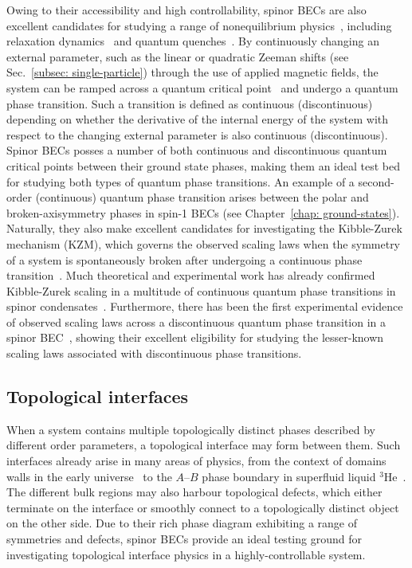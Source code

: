 Owing to their accessibility and high controllability, spinor BECs are also
excellent candidates for studying a range of nonequilibrium
physics~\cite{Schmaljohann2004}, including
relaxation dynamics~\cite{Gring2012, Reeves2022} and quantum
quenches~\cite{Sadler2006,Barnett2011,Navon2015,Symes2017,Kang2017,Prufer2018,
Schmied2019,Liu2020}.
By continuously changing an external parameter, such as the linear or quadratic
Zeeman shifts (see Sec.~\ref{subsec: single-particle}) through the use of
applied magnetic fields, the system can be ramped across a
quantum critical point~\cite{Sachdev2011} and undergo a quantum phase
transition.
Such a transition is defined as continuous (discontinuous) depending on whether
the derivative of the internal energy of the system with respect to the changing
external parameter is also continuous (discontinuous).
Spinor BECs posses a number of both continuous and discontinuous quantum
critical points between their ground state phases, making them an ideal test bed
for studying both types of quantum phase transitions.
An example of a second-order (continuous) quantum phase transition arises
between the polar and broken-axisymmetry phases in spin-1 BECs (see
Chapter~\ref{chap: ground-states}).
Naturally, they also make excellent candidates for investigating the
Kibble-Zurek mechanism (KZM), which governs the observed scaling laws when the
symmetry of a system is spontaneously broken after undergoing a continuous phase
transition~\cite{DelCampo2014}.
Much theoretical and experimental work has already confirmed Kibble-Zurek
scaling in a multitude of continuous quantum phase transitions in spinor
condensates~\cite{Sadler2006, Damski2006,Damski2007, Lamacraft2007,Saito2007,
Saito2007a,Vengalattore2008, Swislocki2013, Witkowska2013, Anquez2016,
Williamson2016,Kang2017}.
Furthermore, there has been the first experimental evidence of observed scaling
laws across a discontinuous quantum phase transition in a spinor
BEC~\cite{Qiu2020}, showing their excellent eligibility for studying the
lesser-known scaling laws associated with discontinuous phase transitions.

\subsection{Topological interfaces}
When a system contains multiple topologically distinct phases described by
different order parameters, a topological interface may form between them.
Such interfaces already arise in many areas of physics, from the context of
domains walls in the early universe~\cite{Zeldovich1975,Kibble1976,Kibble1980}
to the \(A\)--\(B\) phase boundary in superfluid liquid \(^3\)He~\cite{
Osheroff1977,Yip1986,Salomaa1987,Finne2006,Bradley2008,Volovik2009}.
The different bulk regions may also harbour topological defects, which either
terminate on the interface or smoothly connect to a topologically distinct
object on the other side.
Due to their rich phase diagram exhibiting a range of symmetries and defects,
spinor BECs provide an ideal testing ground for investigating topological
interface physics in a highly-controllable system.

